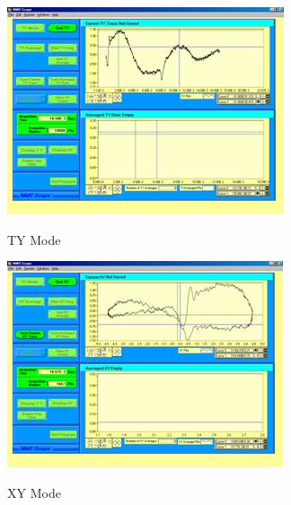 \documentclass{../lab}
\begin{document}
\begin{enumerate}
    \begin{figure}[h]
    \begin{minipage}{0.49\linewidth}
        \centering
        \href{http://experimentationlab.berkeley.edu/sites/default/files/images/NMR36.jpg}{\includegraphics[width=\linewidth]{images/NMR36.jpg}}
        \caption{TY Mode}
    \end{minipage}\hfill
    \begin{minipage}{0.49\linewidth}
        \centering
        \href{http://experimentationlab.berkeley.edu/sites/default/files/images/NMR37.jpg}{\includegraphics[width=\linewidth]{images/NMR37.jpg}}
        \caption{XY Mode}
    \end{minipage}
    \end{figure}
    

\end{enumerate}
\end{document}
